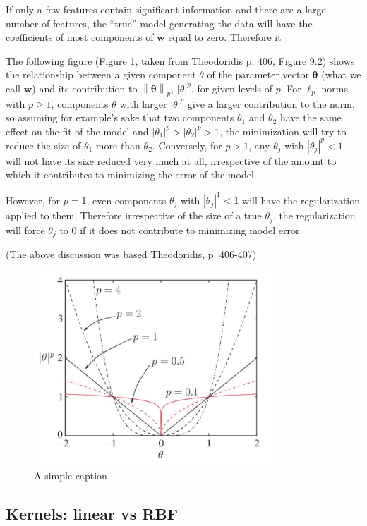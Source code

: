 \documentclass[letterpaper, 12pt]{article}
\newcommand{\norm}[1]{\left\lVert #1 \right\rVert}
\newcommand{\vect}[1]{\boldsymbol{#1}}
\begin{document}
If only a few features contain significant information and there are a large number of features, the ``true'' model generating the data will have the coefficients of most components of $\vect{w}$ equal to zero. Therefore it 

The following figure (Figure 1, taken from Theodoridis p. 406, Figure 9.2) shows the relationship between a given component $\theta$ of the parameter vector $\vect{\theta}$ (what we call $\vect{w}$) and its contribution to $\norm{\vect{\theta}}_p$, $|\theta|^p$, for given levels of $p$. For $\ell_p$ norms with $p \geq 1$, components $\theta$ with larger $|\theta|^p$ give a larger contribution to the norm, so assuming for example's sake that two components $\theta_1$ and $\theta_2$ have the same effect on the fit of the model and $|\theta_1|^p > |\theta_2|^p > 1$, the minimization will try to reduce the size of $\theta_1$ more than $\theta_2$. Conversely, for $p > 1$, any $\theta_j$ with $|\theta_j|^p < 1$ will not have its size reduced very much at all, irrespective of the amount to which it contributes to minimizing the error of the model.

However, for $p = 1$, even components $\theta_j$ with $|\theta_j|^1 < 1$ will have the regularization applied to them. Therefore irrespective of the size of a true $\theta_j$, the regularization will force $\theta_j$ to 0 if it does not contribute to minimizing model error.

(The above discussion was based Theodoridis, p. 406-407)

\begin{figure}[ht!]
\centering
\includegraphics[width=90mm]{figure1.jpg}
\caption{A simple caption \label{overflow}}
\end{figure}

\subsection{Kernels: linear vs RBF}
\end{document}
